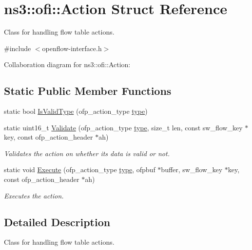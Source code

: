 \hypertarget{structns3_1_1ofi_1_1Action}{}\section{ns3\+:\+:ofi\+:\+:Action Struct Reference}
\label{structns3_1_1ofi_1_1Action}


Class for handling flow table actions.  




{\ttfamily \#include $<$openflow-\/interface.\+h$>$}



Collaboration diagram for ns3\+:\+:ofi\+:\+:Action\+:
\subsection*{Static Public Member Functions}
\begin{DoxyCompactItemize}
\item 
static bool \hyperlink{structns3_1_1ofi_1_1Action_a0e4e57ab2a46f1c43ddab90f6772c461}{Is\+Valid\+Type} (ofp\+\_\+action\+\_\+type \hyperlink{visualizer-ideas_8txt_add98db9e15e2a58cf2b57623e7aa893a}{type})
\item 
static uint16\+\_\+t \hyperlink{structns3_1_1ofi_1_1Action_a8224cead80b4bc38a1d77560f9f2d2c0}{Validate} (ofp\+\_\+action\+\_\+type \hyperlink{visualizer-ideas_8txt_add98db9e15e2a58cf2b57623e7aa893a}{type}, size\+\_\+t len, const sw\+\_\+flow\+\_\+key $\ast$key, const ofp\+\_\+action\+\_\+header $\ast$ah)
\begin{DoxyCompactList}\small\item\em Validates the action on whether its data is valid or not. \end{DoxyCompactList}\item 
static void \hyperlink{structns3_1_1ofi_1_1Action_ad64bbcf0948bb894d7c6dea253974a89}{Execute} (ofp\+\_\+action\+\_\+type \hyperlink{visualizer-ideas_8txt_add98db9e15e2a58cf2b57623e7aa893a}{type}, ofpbuf $\ast$buffer, sw\+\_\+flow\+\_\+key $\ast$key, const ofp\+\_\+action\+\_\+header $\ast$ah)
\begin{DoxyCompactList}\small\item\em Executes the action. \end{DoxyCompactList}\end{DoxyCompactItemize}


\subsection{Detailed Description}
Class for handling flow table actions. 

